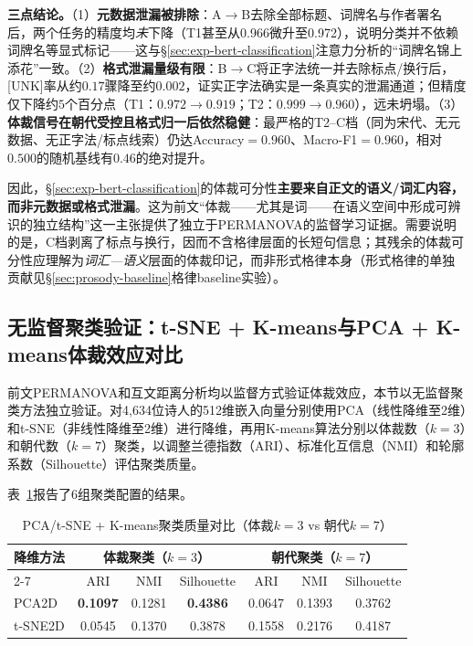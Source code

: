 \documentclass[12pt,a4paper]{article}
\numberwithin{equation}{section}
\begin{document}
\textbf{三点结论。}（1）\textbf{元数据泄漏被排除}：A$\to$B去除全部标题、词牌名与作者署名后，两个任务的精度均\emph{未}下降（T1甚至从0.966微升至0.972），说明分类并不依赖词牌名等显式标记——这与\S\ref{sec:exp-bert-classification}注意力分析的“词牌名锦上添花”一致。（2）\textbf{格式泄漏量级有限}：B$\to$C将正字法统一并去除标点/换行后，[UNK]率从约$0.17$骤降至约$0.002$，证实正字法确实是一条真实的泄漏通道；但精度仅下降约$5$个百分点（T1：$0.972\to0.919$；T2：$0.999\to0.960$），远未坍塌。（3）\textbf{体裁信号在朝代受控且格式归一后依然稳健}：最严格的T2--C档（同为宋代、无元数据、无正字法/标点线索）仍达Accuracy$=0.960$、Macro-F1$=0.960$，相对$0.500$的随机基线有$0.46$的绝对提升。

因此，§\ref{sec:exp-bert-classification}的体裁可分性\textbf{主要来自正文的语义/词汇内容，而非元数据或格式泄漏}。这为前文“体裁——尤其是词——在语义空间中形成可辨识的独立结构”这一主张提供了独立于PERMANOVA的监督学习证据。需要说明的是，C档剥离了标点与换行，因而不含格律层面的长短句信息；其残余的体裁可分性应理解为\emph{词汇—语义}层面的体裁印记，而非形式格律本身（形式格律的单独贡献见\S\ref{sec:prosody-baseline}格律baseline实验）。

\subsection{无监督聚类验证：t-SNE + K-means与PCA + K-means体裁效应对比}
\label{sec:exp-clustering}

前文PERMANOVA和互文距离分析均以监督方式验证体裁效应，本节以无监督聚类方法独立验证。对4,634位诗人的512维嵌入向量分别使用PCA（线性降维至2维）和t-SNE（非线性降维至2维）进行降维，再用K-means算法分别以体裁数（$k=3$）和朝代数（$k=7$）聚类，以调整兰德指数（ARI）、标准化互信息（NMI）和轮廓系数（Silhouette）评估聚类质量。

表~\ref{tab:clustering}报告了6组聚类配置的结果。

\begin{table}[htbp]
  \centering
  \caption{PCA/t-SNE + K-means聚类质量对比（体裁$k=3$ vs 朝代$k=7$）}
  \label{tab:clustering}
  \begin{tabular}{lcccccc}
    \toprule
    \multirow{2}{*}{降维方法} & \multicolumn{3}{c}{体裁聚类（$k=3$）} & \multicolumn{3}{c}{朝代聚类（$k=7$）} \\
    \cmidrule{2-7}
           & ARI   & NMI   & Silhouette & ARI   & NMI   & Silhouette \\
    \midrule
    PCA2D   & \textbf{0.1097} & 0.1281 & \textbf{0.4386} & 0.0647 & 0.1393 & 0.3762 \\
    t-SNE2D & 0.0545 & 0.1370 & 0.3878 & 0.1558 & 0.2176 & 0.4187 \\
    \bottomrule
  \end{tabular}
\end{table}
\end{document}
